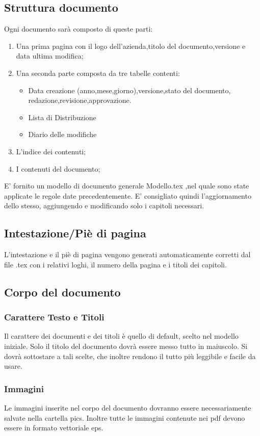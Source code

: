 \documentclass[11pt,titlepage,a4paper]{report}
\begin{document}
\subsection{Struttura documento}
Ogni documento sar\`a composto di queste parti:
\begin{enumerate}
\item Una prima pagina con il logo dell'azienda,titolo del documento,versione e data ultima modifica;
\item Una seconda parte composta da tre tabelle contenti:
	{\begin{itemize}
	\item Data creazione (anno,mese,giorno),versione,stato del documento,\\
			redazione,revisione,approvazione.
	\item Lista di Distribuzione
	\item Diario delle modifiche 
	\end{itemize}}
\item L'indice dei contenuti;
\item I contenuti del documento;
\end{enumerate}
E' fornito un modello di documento generale Modello.tex ,nel quale sono state applicate le regole date precedentemente. E' consigliato quindi l'aggiornamento dello stesso, aggiungendo e modificando solo i capitoli necessari.
\subsection{Intestazione/Pi\`e di pagina}
L'intestazione e il pi\`e di pagina vengono generati automaticamente corretti dal file .tex con i relativi loghi, il numero della pagina e i titoli dei capitoli.
\subsection{Corpo del documento}
\subsubsection{Carattere Testo e Titoli}
Il carattere dei documenti e dei titoli \`e quello di default, scelto nel modello iniziale. Solo il titolo del documento dovr\`a essere messo tutto in maiuscolo. Si dovr\`a sottostare a tali scelte, che inoltre rendono il tutto pi\`u leggibile e facile da usare. 
\subsubsection{Immagini}
Le immagini inserite nel corpo del documento dovranno essere necessariamente salvate nella cartella pics. Inoltre tutte le immagini contenute nei pdf devono essere in formato vettoriale eps.
\end{document}
